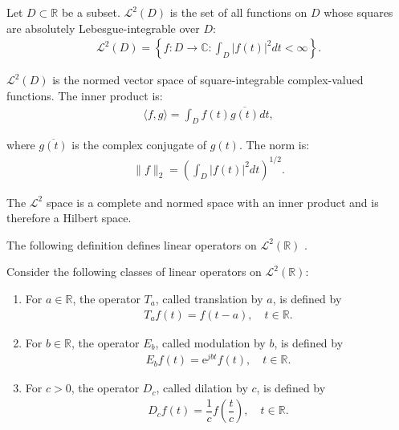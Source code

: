 \begin{definition} \label{def:L2space}
Let $D \subset \mathbb{R}$ be a subset. $\mathcal{L}^2(D)$ is the set of all functions on $D$ whose squares are absolutely Lebesgue-integrable over $D$:
\begin{align*}
\mathcal{L}^2(D) = \left\{ f: D \to \mathbb{C}: \int_D |f(t)|^2 dt < \infty \right\}.
\end{align*}

$\mathcal{L}^2(D)$ is the normed vector space of square-integrable complex-valued functions. The inner product is:
\begin{align*}
\langle f,g \rangle =  \int_D f(t) \overline{g(t)} dt,
\end{align*}

where $\overline{g(t)}$ is the complex conjugate of $g(t)$. The norm is:
\begin{align*}
\|f\|_2 = \left( \int_D |f(t)|^2 dt \right)^{1/2}.
\end{align*}

The $\mathcal{L}^2$ space is a complete and normed space with an inner product and is therefore a Hilbert space.

\end{definition}

The following definition defines linear operators on $\mathcal{L}^2(\mathbb{R})$ \cite{page 120, FSE2010}.

\begin{definition} \label{def:TMD}
Consider the following classes of linear operators on $\mathcal{L}^2(\mathbb{R})$:
\begin{enumerate}
\item For $a \in \mathbb{R}$, the operator $T_a$, called translation by $a$, is defined by
\begin{align*}
T_a f(t) = f(t-a), \quad t \in \mathbb{R}.
\end{align*}

\item For $b \in \mathbb{R}$, the operator $E_b$, called modulation by $b$, is defined by
\begin{align*}
E_b f(t) = \text{e}^{j b t} f(t), \quad t \in \mathbb{R}.
\end{align*}

\item For $c > 0$, the operator $D_c$, called dilation by $c$, is defined by
\begin{align*}
D_c f(t) = \dfrac{1}{c} f\left( \dfrac{t}{c} \right), \quad t \in \mathbb{R}.
\end{align*}
\end{enumerate}
\end{definition}

